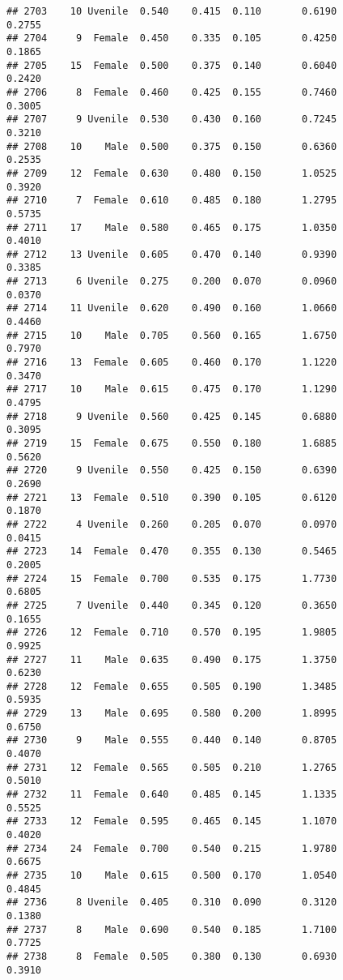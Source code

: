 \documentclass[
]{article}
\begin{document}
\begin{verbatim}
## 2703    10 Uvenile  0.540    0.415  0.110       0.6190         0.2755
## 2704     9  Female  0.450    0.335  0.105       0.4250         0.1865
## 2705    15  Female  0.500    0.375  0.140       0.6040         0.2420
## 2706     8  Female  0.460    0.425  0.155       0.7460         0.3005
## 2707     9 Uvenile  0.530    0.430  0.160       0.7245         0.3210
## 2708    10    Male  0.500    0.375  0.150       0.6360         0.2535
## 2709    12  Female  0.630    0.480  0.150       1.0525         0.3920
## 2710     7  Female  0.610    0.485  0.180       1.2795         0.5735
## 2711    17    Male  0.580    0.465  0.175       1.0350         0.4010
## 2712    13 Uvenile  0.605    0.470  0.140       0.9390         0.3385
## 2713     6 Uvenile  0.275    0.200  0.070       0.0960         0.0370
## 2714    11 Uvenile  0.620    0.490  0.160       1.0660         0.4460
## 2715    10    Male  0.705    0.560  0.165       1.6750         0.7970
## 2716    13  Female  0.605    0.460  0.170       1.1220         0.3470
## 2717    10    Male  0.615    0.475  0.170       1.1290         0.4795
## 2718     9 Uvenile  0.560    0.425  0.145       0.6880         0.3095
## 2719    15  Female  0.675    0.550  0.180       1.6885         0.5620
## 2720     9 Uvenile  0.550    0.425  0.150       0.6390         0.2690
## 2721    13  Female  0.510    0.390  0.105       0.6120         0.1870
## 2722     4 Uvenile  0.260    0.205  0.070       0.0970         0.0415
## 2723    14  Female  0.470    0.355  0.130       0.5465         0.2005
## 2724    15  Female  0.700    0.535  0.175       1.7730         0.6805
## 2725     7 Uvenile  0.440    0.345  0.120       0.3650         0.1655
## 2726    12  Female  0.710    0.570  0.195       1.9805         0.9925
## 2727    11    Male  0.635    0.490  0.175       1.3750         0.6230
## 2728    12  Female  0.655    0.505  0.190       1.3485         0.5935
## 2729    13    Male  0.695    0.580  0.200       1.8995         0.6750
## 2730     9    Male  0.555    0.440  0.140       0.8705         0.4070
## 2731    12  Female  0.565    0.505  0.210       1.2765         0.5010
## 2732    11  Female  0.640    0.485  0.145       1.1335         0.5525
## 2733    12  Female  0.595    0.465  0.145       1.1070         0.4020
## 2734    24  Female  0.700    0.540  0.215       1.9780         0.6675
## 2735    10    Male  0.615    0.500  0.170       1.0540         0.4845
## 2736     8 Uvenile  0.405    0.310  0.090       0.3120         0.1380
## 2737     8    Male  0.690    0.540  0.185       1.7100         0.7725
## 2738     8  Female  0.505    0.380  0.130       0.6930         0.3910

\end{verbatim}
\end{document}
